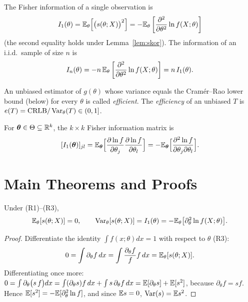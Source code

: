\documentclass[main.tex]{subfiles}
\begin{document}
\begin{definition}\label{def:fisher}
The Fisher information of a single observation is
\[
I_1(\theta)=\mathbb{E}_\theta\Big[\big(s(\theta;X)\big)^2\Big]=-\mathbb{E}_\theta\left[\frac{\partial^2}{\partial \theta^2}\ln f(X;\theta)\right]
\]
(the second equality holds under Lemma~\ref{lem:skor}). The information of an i.i.d.\ sample of size $n$ is
\[
I_n(\theta) = -n\, \mathbb{E}_\theta\left[\frac{\partial^2}{\partial \theta^2}\ln f(X;\theta)\right]=n\,I_1(\theta).
\]
\end{definition}

\begin{definition}
An unbiased estimator of $g(\theta)$ whose variance equals the Cramér--Rao lower bound (below) for every $\theta$ is called \emph{efficient}. The \emph{efficiency} of an unbiased $T$ is $e(T)=\text{CRLB}/\operatorname{Var}_\theta(T)\in(0,1]$.
\end{definition}

\begin{definition}
For $\bm\theta\in\Theta\subseteq\mathbb{R}^k$, the $k\times k$ Fisher information matrix is
\[
[I_1(\bm\theta)]_{jl}=\mathbb{E}_{\bm\theta}\Big[\frac{\partial\ln f}{\partial\theta_j}\frac{\partial\ln f}{\partial\theta_l}\Big]=-\mathbb{E}_{\bm\theta}\Big[\frac{\partial^2\ln f}{\partial\theta_j\partial\theta_l}\Big].
\]
\end{definition}

\section{Main Theorems and Proofs}

\begin{lemma}\label{lem:skor}
Under (R1)--(R3),
\[
\mathbb{E}_\theta[s(\theta;X)]=0,\qquad \operatorname{Var}_\theta[s(\theta;X)]=I_1(\theta)=-\mathbb{E}_\theta\big[\partial_\theta^2\ln f(X;\theta)\big].
\]
\end{lemma}
\begin{proof}
Differentiate the identity $\int f(x;\theta)dx=1$ with respect to $\theta$ (R3):
\[
0=\int\partial_\theta f\,dx=\int\frac{\partial_\theta f}{f}f\,dx=\mathbb{E}_\theta[s(\theta;X)].
\]
Differentiating once more: $0=\int\partial_\theta\big(s\,f\big)dx=\int(\partial_\theta s)f\,dx+\int s\,\partial_\theta f\,dx=\mathbb{E}[\partial_\theta s]+\mathbb{E}[s^2]$, because $\partial_\theta f=s f$. Hence $\mathbb{E}[s^2]=-\mathbb{E}[\partial^2_\theta\ln f]$, and since $\mathbb{E} s=0$, $\operatorname{Var}(s)=\mathbb{E} s^2$.
\end{proof}
\end{document}
